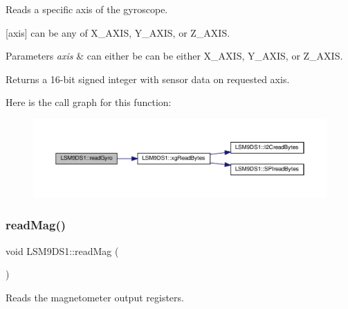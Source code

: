 Reads a specific axis of the gyroscope. 

\mbox{[}axis\mbox{]} can be any of X\+\_\+\+A\+X\+IS, Y\+\_\+\+A\+X\+IS, or Z\+\_\+\+A\+X\+IS.


\begin{DoxyParams}{Parameters}
{\em axis} & can either be can be either X\+\_\+\+A\+X\+IS, Y\+\_\+\+A\+X\+IS, or Z\+\_\+\+A\+X\+IS. \\
\hline
\end{DoxyParams}
\begin{DoxyReturn}{Returns}
a 16-\/bit signed integer with sensor data on requested axis. 
\end{DoxyReturn}
Here is the call graph for this function\+:
\nopagebreak
\begin{figure}[H]
\begin{center}
\leavevmode
\includegraphics[width=350pt]{classLSM9DS1_adc1b37609a6c850328b16da4f911cefd_cgraph}
\end{center}
\end{figure}
\mbox{\label{classLSM9DS1_ae127cf75aa5f3c5421e49363795dcd38}} 
\subsubsection{\texorpdfstring{read\+Mag()}{readMag()}\hspace{0.1cm}{\footnotesize\ttfamily [1/2]}}
{\footnotesize\ttfamily void L\+S\+M9\+D\+S1\+::read\+Mag (\begin{DoxyParamCaption}{ }\end{DoxyParamCaption})}



Reads the magnetometer output registers. 

